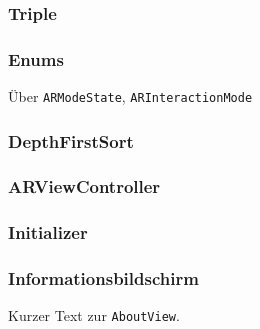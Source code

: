 \subsubsection{Triple}

\subsubsection{Enums} \label{subsub:umsetzung-enums}

Über \texttt{ARModeState}, \texttt{ARInteractionMode}

\subsubsection{DepthFirstSort} \label{subsub:umsetzung-depthfirst}

\subsubsection{ARViewController} \label{subsub:umsetzung-arviewcontroller}

\subsubsection{Initializer}

\subsubsection{Informationsbildschirm}

Kurzer Text zur \texttt{AboutView}.
